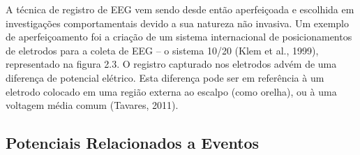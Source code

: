 A técnica de registro de EEG vem sendo desde então aperfeiçoada e escolhida em investigações 
comportamentais devido a sua natureza não invasiva.
 Um exemplo de aperfeiçoamento foi a criação de um sistema internacional de posicionamentos 
 de eletrodos para a coleta de EEG – o sistema 10/20 (Klem et al., 1999), 
 representado na figura 2.3. 
 O registro capturado nos eletrodos advém de uma 
 diferença de potencial elétrico. Esta diferença pode ser em 
 referência à um eletrodo colocado em uma região externa ao escalpo (como orelha), 
 ou à uma voltagem média comum (Tavares, 2011).




\subsection{Potenciais Relacionados a Eventos}


